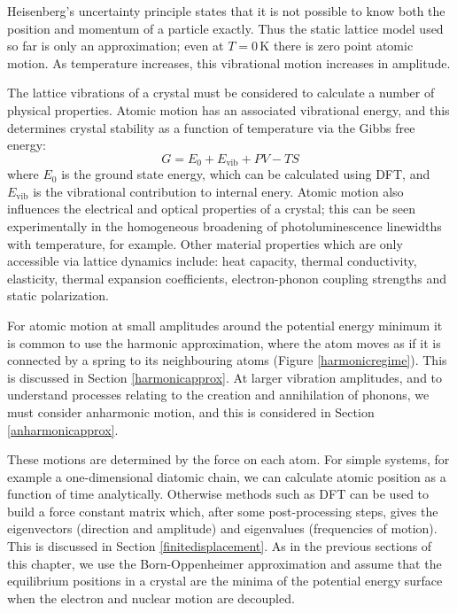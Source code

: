 Heisenberg's uncertainty principle states that it is not possible to know both the position and momentum of a particle exactly. Thus the static lattice model used so far is only an approximation; even at $T=0\,\textrm{K}$ there is zero point atomic motion. As temperature increases, this vibrational motion increases in amplitude.

The lattice vibrations of a crystal must be considered to calculate a number of physical properties. Atomic motion has an associated vibrational energy, and this determines crystal stability as a function of temperature via the Gibbs free energy:\autocite{Dove1993}
\begin{equation}
G = E_0+E_\textrm{vib}+PV-TS
\end{equation}
where $E_0$ is the ground state energy, which can be calculated using DFT, and $E_\textrm{vib}$ is the vibrational contribution to internal enery.
Atomic motion also influences the electrical and optical properties of a crystal; this can be seen experimentally in the homogeneous broadening of photoluminescence linewidths with temperature, for example.\autocite{silsbee1962} %
Other material properties which are only accessible via lattice dynamics include: heat capacity, thermal conductivity, elasticity, thermal expansion coefficients, electron-phonon coupling strengths and static polarization.

For atomic motion at small amplitudes around the potential energy minimum it is common to use the harmonic approximation, where the atom moves as if it is connected by a spring to its neighbouring atoms (Figure \ref{harmonicregime}). This is discussed in Section \ref{harmonicapprox}. At larger vibration amplitudes, and to understand processes relating to the creation and annihilation of phonons, we must consider anharmonic motion, and this is considered in Section \ref{anharmonicapprox}.

These motions are determined by the force on each atom. For simple systems, for example a one-dimensional diatomic chain, we can calculate atomic position as a function of time analytically. Otherwise methods such as DFT can be used to build a force constant matrix which, after some post-processing steps, gives the eigenvectors (direction and amplitude) and eigenvalues (frequencies of motion). This is discussed in Section \ref{finitedisplacement}. As in the previous sections of this chapter, we use the Born-Oppenheimer approximation and assume that the equilibrium positions in a crystal are the minima of the potential energy surface when the electron and nuclear motion are decoupled.


